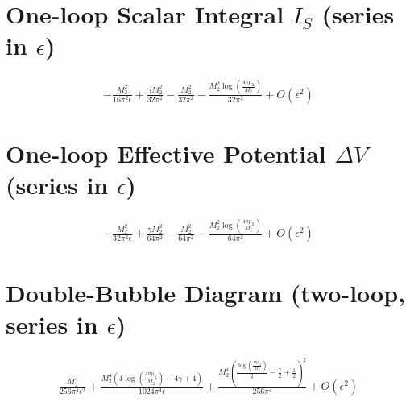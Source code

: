 \documentclass{article}
\begin{document}
\section*{One-loop Scalar Integral $I_S$ (series in $\epsilon$)}
\begin{align*}
- \frac{M_{2}^{2}}{16 \pi^{2} \epsilon} + \frac{\gamma M_{2}^{2}}{32 \pi^{2}} - \frac{M_{2}^{2}}{32 \pi^{2}} - \frac{M_{2}^{2} \log{\left(\frac{4 \pi \mu_{2}}{M_{2}} \right)}}{32 \pi^{2}} + O\left(\epsilon^{2}\right)
\end{align*}

\section*{One-loop Effective Potential $\Delta V$ (series in $\epsilon$)}
\begin{align*}
- \frac{M_{2}^{2}}{32 \pi^{2} \epsilon} + \frac{\gamma M_{2}^{2}}{64 \pi^{2}} - \frac{M_{2}^{2}}{64 \pi^{2}} - \frac{M_{2}^{2} \log{\left(\frac{4 \pi \mu_{2}}{M_{2}} \right)}}{64 \pi^{2}} + O\left(\epsilon^{2}\right)
\end{align*}

\section*{Double-Bubble Diagram (two-loop, series in $\epsilon$)}
\begin{align*}
\frac{M_{2}^{4}}{256 \pi^{4} \epsilon^{2}} + \frac{M_{2}^{4} \left(4 \log{\left(\frac{4 \pi \mu_{2}}{M_{2}} \right)} - 4 \gamma + 4\right)}{1024 \pi^{4} \epsilon} + \frac{M_{2}^{4} \left(\frac{\log{\left(\frac{4 \pi \mu_{2}}{M_{2}} \right)}}{2} - \frac{\gamma}{2} + \frac{1}{2}\right)^{2}}{256 \pi^{4}} + O\left(\epsilon^{2}\right)
\end{align*}
\end{document}
